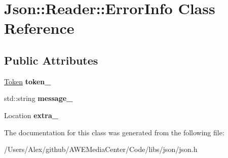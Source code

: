 \hypertarget{class_json_1_1_reader_1_1_error_info}{\section{Json\-:\-:Reader\-:\-:Error\-Info Class Reference}
\label{class_json_1_1_reader_1_1_error_info}
}
\subsection*{Public Attributes}
\begin{DoxyCompactItemize}
\item 
\hypertarget{class_json_1_1_reader_1_1_error_info_a52e1c71b12eb1c3f0395d7ef1e778ce6}{\hyperlink{class_json_1_1_reader_1_1_token}{Token} {\bfseries token\-\_\-}}\label{class_json_1_1_reader_1_1_error_info_a52e1c71b12eb1c3f0395d7ef1e778ce6}

\item 
\hypertarget{class_json_1_1_reader_1_1_error_info_aeb2fb6537a8bb978b239ea1482d73d7a}{std\-::string {\bfseries message\-\_\-}}\label{class_json_1_1_reader_1_1_error_info_aeb2fb6537a8bb978b239ea1482d73d7a}

\item 
\hypertarget{class_json_1_1_reader_1_1_error_info_af92c24acf642b040d6e40aac4952d44d}{Location {\bfseries extra\-\_\-}}\label{class_json_1_1_reader_1_1_error_info_af92c24acf642b040d6e40aac4952d44d}

\end{DoxyCompactItemize}


The documentation for this class was generated from the following file\-:\begin{DoxyCompactItemize}
\item 
/\-Users/\-Alex/github/\-A\-W\-E\-Media\-Center/\-Code/libs/json/json.\-h\end{DoxyCompactItemize}
